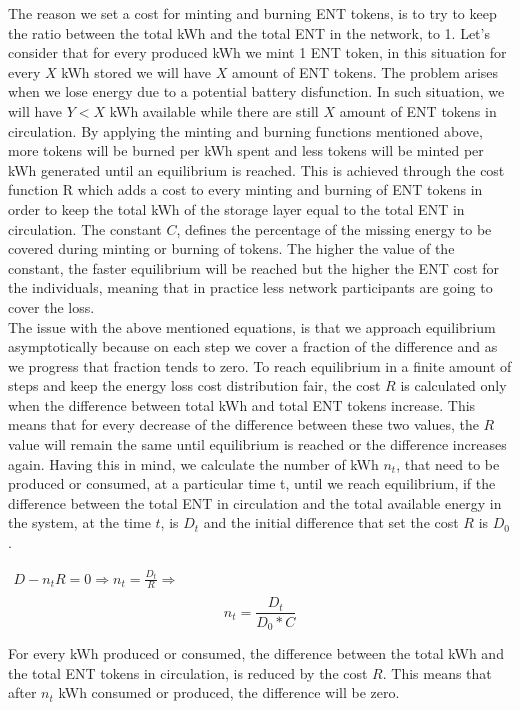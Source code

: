 The reason we set a cost for minting and burning ENT tokens, is to try to keep the ratio between the total kWh and the total ENT in the network, to 1. Let's consider that for every produced kWh we mint 1 ENT token, in this situation for every $X$ kWh stored we will have $X$ amount of ENT tokens. 
The problem arises when we lose energy due to a potential battery disfunction. In such situation, we will have $Y<X$ kWh available while there are still $X$ amount of ENT tokens in circulation. By applying the minting and burning
functions mentioned above, more tokens will be burned per kWh spent and less tokens will be minted per kWh generated until an equilibrium is reached. This is achieved through the cost function R which adds a cost to every minting 
and burning of ENT tokens in order to keep the total kWh of the storage layer equal to the total ENT in circulation. The constant $C$, defines the percentage of the missing energy to be covered during minting or burning of tokens. The higher the value of the constant, 
the faster equilibrium will be reached but the higher the ENT cost for the individuals, meaning that in practice less network participants are going to cover the loss.\\
The issue with the above mentioned equations, is that we approach equilibrium asymptotically because on each step we cover a fraction of the difference and as we progress that fraction tends to zero. To reach equilibrium in a finite amount of steps and keep the energy loss cost distribution fair, 
the cost $R$ is calculated only when the difference between total kWh and total ENT tokens increase. This means that for every decrease of the difference between these two values, the $R$ value will remain the same until equilibrium is reached or the difference increases again. 
Having this in mind, we calculate the number of kWh $n_t$, that need to be produced or consumed, at a particular time t, until we reach equilibrium, if the difference between the total ENT in circulation and the total available energy in the system, at the time $t$, is $D_t$ and the initial difference that set the cost $R$ is $D_0$. 
\begin{center}
    \begin{math}
        \begin{array}{c}
        D-n_tR = 0 \Rightarrow n_t = \frac{D_t}{R} \Rightarrow\\
    \end{array}
    \end{math}
    \begin{equation}   
        \boxed{n_t = \frac{D_t}{D_0*C}}
        \label{equ:kwh_until_equilibrium}
    \end{equation}
\end{center}
For every kWh produced or consumed, the difference between the total kWh and the total ENT tokens in circulation, is reduced by the cost $R$. This means that after $n_t$ kWh consumed or produced, the difference will be zero.

